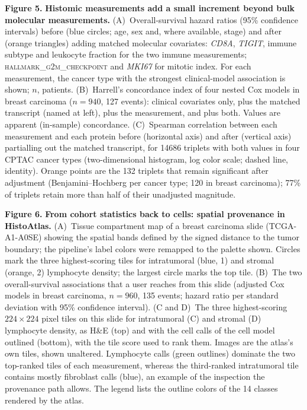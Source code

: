 \label{fig:fig5}
\noindent\textbf{Figure 5.} \textbf{Histomic measurements add a small increment beyond bulk 
molecular measurements.} 
(A)~Overall-survival hazard ratios (95\% confidence intervals) before (blue 
circles; age, sex and, where available, stage) and after (orange triangles) 
adding matched molecular covariates: \textit{CD8A}, \textit{TIGIT}, immune 
subtype and leukocyte fraction for the two immune measurements; 
\textsc{hallmark\_g2m\_checkpoint} and \textit{MKI67} for mitotic index. For 
each measurement, the cancer type with the strongest clinical-model association 
is shown; $n$, patients. 
(B)~Harrell's concordance index of four nested Cox models in breast carcinoma 
($n = 940$, 127 events): clinical covariates only, plus the matched transcript 
(named at left), plus the measurement, and plus both. Values are apparent 
(in-sample) concordance. 
(C)~Spearman correlation between each measurement and each protein before 
(horizontal axis) and after (vertical axis) partialling out the matched 
transcript, for \num{14686} triplets with both values in four CPTAC cancer types 
(two-dimensional histogram, log color scale; dashed line, identity). Orange 
points are the 132 triplets that remain significant after adjustment 
(Benjamini--Hochberg per cancer type; 120 in breast carcinoma); 77\% of 
triplets retain more than half of their unadjusted magnitude.
\par\medskip

\label{fig:fig6}
\noindent\textbf{Figure 6.} \textbf{From cohort statistics back to cells: spatial provenance in 
HistoAtlas.} 
(A)~Tissue compartment map of a breast carcinoma slide (TCGA-A1-A0SE) showing 
the spatial bands defined by the signed distance to the tumor boundary; the 
pipeline's label colors were remapped to the palette shown. Circles mark the 
three highest-scoring tiles for intratumoral (blue, 1) and stromal (orange, 2) 
lymphocyte density; the largest circle marks the top tile. 
(B)~The two overall-survival associations that a user reaches from this slide 
(adjusted Cox models in breast carcinoma, $n = 960$, 135 events; hazard ratio 
per standard deviation with 95\% confidence interval). 
(C and D)~The three highest-scoring $224 \times 224$ pixel tiles on this slide 
for intratumoral (C) and stromal (D) lymphocyte density, as H\&E (top) and with 
the cell calls of the cell model outlined (bottom), with the tile score used to 
rank them. Images are the atlas's own tiles, shown unaltered. Lymphocyte calls 
(green outlines) dominate the two top-ranked tiles of each measurement, whereas 
the third-ranked intratumoral tile contains mostly fibroblast calls (blue), an 
example of the inspection the provenance path allows. The legend lists the outline colors of the 14 classes 
rendered by the atlas.
\par\medskip


